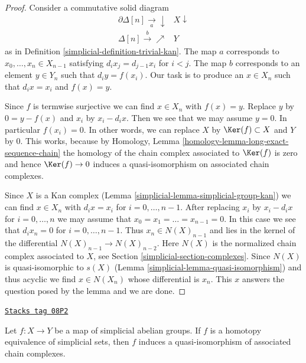 \begin{proof}

Consider a commutative solid diagram
$$
\begin{array}{cc}\partial \Delta[n] \underset{a}{\longrightarrow}\downarrow & X \downarrow \\ \Delta[n] \overset{b}{\longrightarrow}\nearrow & Y\end{array}
$$
as in Definition \ref{simplicial-definition-trivial-kan}. The map $a$ corresponds
to $x_0, \ldots, x_n \in X_{n - 1}$ satisfying $d_i x_j = d_{j - 1} x_i$
for $i < j$. The map $b$ corresponds to an element $y \in Y_n$ such
that $d_iy = f(x_i)$. Our task is to produce an $x \in X_n$ such that
$d_ix = x_i$ and $f(x) = y$.

\medskip\noindent
Since $f$ is termwise surjective we can find $x \in X_n$ with $f(x) = y$.
Replace $y$ by $0 = y - f(x)$ and $x_i$ by $x_i - d_ix$. Then we
see that we may assume $y = 0$. In particular $f(x_i) = 0$.
In other words, we can replace $X$ by $\Ker(f) \subset X$
and $Y$ by $0$. This works, because by
Homology, Lemma \ref{homology-lemma-long-exact-sequence-chain}
the homology of the chain complex associated to $\Ker(f)$
is zero and hence $\Ker(f) \to 0$ induces a quasi-isomorphism
on associated chain complexes.

\medskip\noindent
Since $X$ is a Kan complex (Lemma \ref{simplicial-lemma-simplicial-group-kan})
we can find $x \in X_n$ with $d_i x = x_i$ for $i = 0, \ldots, n - 1$.
After replacing $x_i$ by $x_i - d_ix$ for $i = 0, \ldots, n$ we
may assume that $x_0 = x_1 = \ldots = x_{n - 1} = 0$.
In this case we see that $d_i x_n = 0$ for $i = 0, \ldots, n - 1$.
Thus $x_n \in N(X)_{n - 1}$ and lies in the kernel of the differential
$N(X)_{n - 1} \to N(X)_{n - 2}$. Here $N(X)$ is the normalized chain
complex associated to $X$, see Section \ref{simplicial-section-complexes}.
Since $N(X)$ is quasi-isomorphic to $s(X)$
(Lemma \ref{simplicial-lemma-quasi-isomorphism})
and thus acyclic we find $x \in N(X_n)$ whose differential is $x_n$.
This $x$ answers the question posed by the lemma and we are done.
\end{proof}

\begin{lemma}
\label{simplicial-lemma-homotopy-equivalence}
\href{https://stacks.math.columbia.edu/tag/08P2}{\texttt{Stacks tag 08P2}}

Let $f : X \to Y$ be a map of simplicial abelian groups. If $f$ is a
homotopy equivalence of simplicial sets, then $f$ induces a
quasi-isomorphism of associated chain complexes.
\end{lemma}

